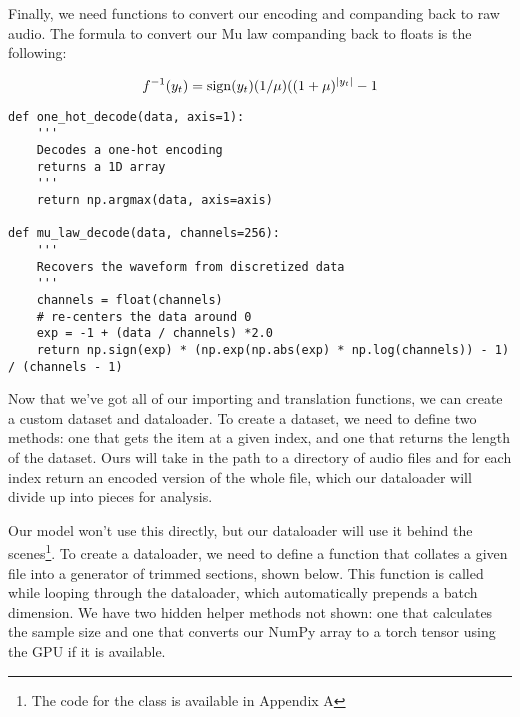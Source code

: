Finally, we need functions to convert our encoding and companding back to raw audio. The formula to convert our Mu law companding back to floats is the following:

\[f^{-1}(y_t)=\operatorname{sign}(y_t)(1/\mu)((1+\mu)^{|y_t|}-1\]

\begin{verbatim}
def one_hot_decode(data, axis=1):
    '''
    Decodes a one-hot encoding
    returns a 1D array
    '''
    return np.argmax(data, axis=axis)
    
def mu_law_decode(data, channels=256):
    '''
    Recovers the waveform from discretized data
    '''
    channels = float(channels)
    # re-centers the data around 0
    exp = -1 + (data / channels) *2.0
    return np.sign(exp) * (np.exp(np.abs(exp) * np.log(channels)) - 1) / (channels - 1)
\end{verbatim}

Now that we've got all of our importing and translation functions, we can create a custom dataset and dataloader. To create a dataset, we need to define two methods: one that gets the item at a given index, and one that returns the length of the dataset. Ours will take in the path to a directory of audio files and for each index return an encoded version of the whole file, which our dataloader will divide up into pieces for analysis.

Our model won't use this directly, but our dataloader will use it behind the scenes\footnote{The code for the  class is available in Appendix A}. To create a dataloader, we need to define a function that collates a given file into a generator of trimmed sections, shown below. This function is called while looping through the dataloader, which automatically prepends a batch dimension. We have two hidden helper methods not shown: one that calculates the sample size and one that converts our NumPy array to a torch tensor using the GPU if it is available.

